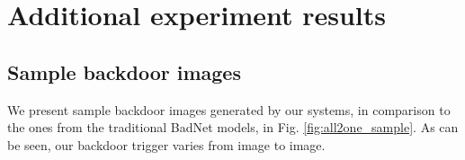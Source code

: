 \section{Additional experiment results}

\subsection{Sample backdoor images}
We present sample backdoor images generated by our systems, in comparison to the ones from the traditional BadNet models, in Fig. \ref{fig:all2one_sample}. As can be seen, our backdoor trigger varies from image to image.

\begin{figure}[t]
\centering
{}
\hspace{2mm}
\\
\vskip 0.05in


\end{figure}
